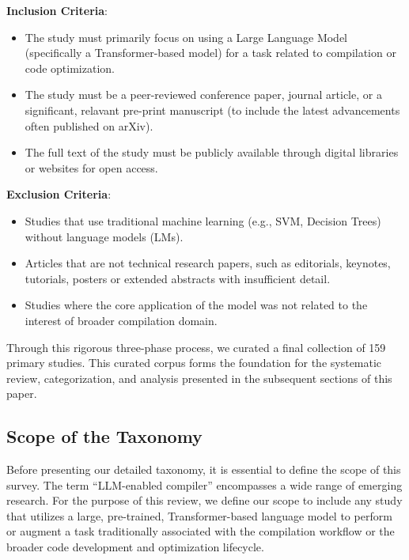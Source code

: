 \documentclass[pdflatex,sn-mathphys-ay,twocolumn, a4paper]{sn-jnl}%
\theoremstyle{thmstyleone}%
\theoremstyle{thmstyletwo}%
\theoremstyle{thmstylethree}%
\begin{document}
\begin{enumerate}
    \textbf{Inclusion Criteria}:\begin{itemize}
        \item The study must primarily focus on using a Large Language Model (specifically a Transformer-based model) for a task related to compilation or code optimization.
        \item The study must be a peer-reviewed conference paper, journal article, or a significant, relavant pre-print manuscript (to include the latest advancements often published on arXiv).
        \item The full text of the study must be publicly available through digital libraries or websites for open access.
    \end{itemize}
    \textbf{Exclusion Criteria}:\begin{itemize}
        \item Studies that use traditional machine learning (e.g., SVM, Decision Trees) without language models (LMs).
        \item Articles that are not technical research papers, such as editorials, keynotes, tutorials, posters or extended abstracts with insufficient detail.
        \item Studies where the core application of the model was not related to the interest of broader compilation domain.
    \end{itemize}
\end{enumerate}

Through this rigorous three-phase process, we curated a final collection of 159 primary studies. This curated corpus forms the foundation for the systematic review, categorization, and analysis presented in the subsequent sections of this paper.


\subsection{Scope of the Taxonomy}

Before presenting our detailed taxonomy, it is essential to define the scope of this survey. The term ``LLM-enabled compiler'' encompasses a wide range of emerging research. For the purpose of this review, we define our scope to include any study that utilizes a large, pre-trained, Transformer-based language model to perform or augment a task traditionally associated with the compilation workflow or the broader code development and optimization lifecycle.
\end{document}
